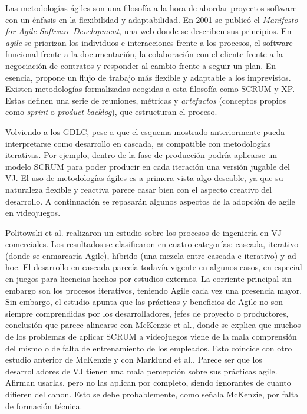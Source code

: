 Las metodologías ágiles son una filosofía a la hora de abordar proyectos software con un énfasis en la flexibilidad y adaptabilidad. En 2001 se publicó el \textit{Manifesto for Agile Software Development}\cite{agile-manifesto}, una web donde se describen sus principios. En \textit{agile} se priorizan los individuos e interacciones frente a los procesos, el software funcional frente a la documentación, la colaboración con el cliente frente a la negociación de contratos y responder al cambio frente a seguir un plan.  En esencia, propone un flujo de trabajo más flexible y adaptable a los imprevistos. Existen metodologías formalizadas acogidas a esta filosofía como SCRUM y XP. Estas definen una serie de reuniones, métricas y \textit{artefactos} (conceptos propios como \textit{sprint} o \textit{product backlog}), que estructuran el proceso.

Volviendo a los GDLC, pese a que el esquema mostrado anteriormente pueda interpretarse como desarrollo en cascada, es compatible con metodologías iterativas. Por ejemplo, dentro de la fase de producción podría aplicarse un modelo SCRUM para poder producir en cada iteración una versión jugable del VJ. El uso de metodologías ágiles es a primera vista algo deseable, ya que su naturaleza flexible y reactiva parece casar bien con el aspecto creativo del desarrollo. A continuación se repasarán algunos aspectos de la adopción de agile en videojuegos.

Politowski et al.\cite{politowski} realizaron un estudio sobre los procesos de ingeniería en VJ comerciales. Los resultados se clasificaron en cuatro categorías: cascada, iterativo (donde se enmarcaría Agile), híbrido (una mezcla entre cascada e iterativo) y ad-hoc. El desarrollo en cascada parecía todavía vigente en algunos casos, en especial en juegos para licencias hechos por estudios externos. La corriente principal sin embargo son los procesos iterativos, teniendo Agile cada vez una presencia mayor. Sin embargo, el estudio apunta que las prácticas y beneficios de Agile no son siempre comprendidas por los desarrolladores, jefes de proyecto o productores, conclusión que parece alinearse con McKenzie et al.\cite{mckenzie}, donde se explica que muchos de los problemas de aplicar SCRUM a videojuegos viene de la mala comprensión del mismo o de falta de entrenamiento de los empleados. Esto coincice con otro estudio anterior de McKenzie\cite{mckenzie2} y con Marklund et al.\cite{marklund}. Parece ser que los desarrolladores de VJ tienen una mala percepción sobre sus prácticas agile. Afirman usarlas, pero no las aplican por completo, siendo ignorantes de cuanto difieren del canon. Esto se debe probablemente, como señala McKenzie\cite{mckenzie}, por falta de formación técnica.

